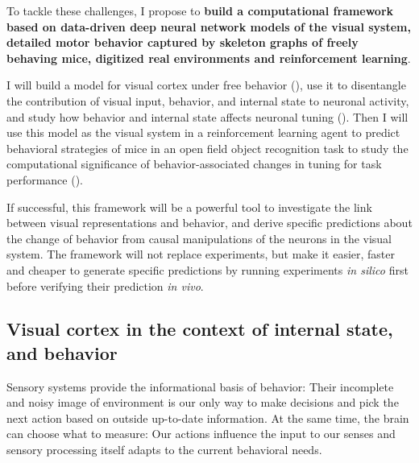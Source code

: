 \documentclass[B2,COG]{ercgrant}
\begin{document}
To tackle these challenges, I propose to \textbf{build a computational framework based on data-driven deep neural network models of the visual system, detailed motor behavior captured by skeleton graphs of freely behaving mice, digitized real environments and reinforcement learning}.


I will build a model for visual cortex under free behavior (), use it to disentangle the contribution of visual input, behavior, and internal state to neuronal activity, and study how behavior and internal state affects neuronal tuning (). Then I will use this model as the visual system in a reinforcement learning agent to predict behavioral strategies of mice in an open field object recognition task to study the computational significance of behavior-associated changes in tuning for task performance ().

If successful, this framework will be a powerful tool to investigate the link between visual representations and behavior, and derive specific predictions about the change of behavior from causal manipulations of the neurons in the visual system.
The framework will not replace experiments, but make it easier, faster and cheaper to generate specific predictions by running experiments \textit{in silico} first before verifying their prediction \textit{in vivo}. 



\subsection{Visual cortex in the context of internal state, and behavior}

Sensory systems provide the informational basis of behavior: Their incomplete and noisy image of environment is our only way to make decisions and pick the next action based on outside up-to-date information. 
At the same time, the brain can choose what to measure: Our actions influence the input to our senses and sensory processing itself adapts to the current behavioral needs. 
\end{document}
